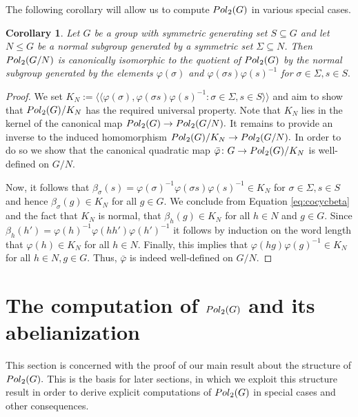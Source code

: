\documentclass[a4paper,11pt]{amsproc}
\theoremstyle{plain}
\newtheorem{corollary}[theorem]{Corollary}
\theoremstyle{definition}
\begin{document}
The following corollary will allow us to compute ${\rm Pol}_2(G)$ in various special cases.


\begin{corollary} \label{cor:comp}
Let $G$ be a group with symmetric generating set $S \subseteq G$ and let $N \leq G$ be a normal subgroup generated by a symmetric set $\Sigma \subseteq N$. Then ${\rm Pol}_2(G/N)$ is canonically isomorphic to the quotient of ${\rm Pol}_2(G)$ by the normal subgroup generated by the elements $\varphi(\sigma)$ and $\varphi(\sigma s) \varphi(s)^{-1}$ for $\sigma \in \Sigma, s \in S.$\end{corollary}
\begin{proof}
We set $K_N := \langle \! \langle \varphi(\sigma), \varphi(\sigma s) \varphi(s)^{-1}\colon  \sigma \in \Sigma, s \in S \rangle \! \rangle$ and aim to show that ${\rm Pol}_2(G)/K_N$ has the required universal property. Note that $K_N$ lies in the kernel of the canonical map ${\rm Pol}_2(G) \to {\rm Pol}_2(G/N).$ It remains to provide an inverse to the induced homomorphism ${\rm Pol}_2(G)/K_N \to {\rm Pol}_2(G/N).$ In order to do so we show that the canonical quadratic map $\bar \varphi \colon G \to {\rm Pol}_2(G)/K_N$ is well-defined on $G/N.$

Now, it follows that $\beta_{\sigma}(s) = \varphi(\sigma)^{-1}\varphi(\sigma s) \varphi(s)^{-1}  \in K_N$ for $\sigma \in \Sigma, s\in S$ and hence $\beta_{\sigma}(g) \in K_N$ for all $g \in G$. We conclude from Equation \eqref{eq:cocycbeta} and the fact that $K_N$ is normal, that $\beta_h(g) \in K_N$ for all $h \in N$ and $g \in G.$ Since $\beta_{h}(h')= \varphi(h)^{-1} \varphi(hh')\varphi(h')^{-1}$ it follows by induction on the word length that $\varphi(h) \in K_N$ for all $h \in N.$ Finally, this implies that $\varphi(hg)\varphi(g)^{-1} \in K_N$ for all $h \in N,g \in G$. Thus, $\bar \varphi$ is indeed well-defined on $G/N.$
\end{proof}

\section{The computation of ${\rm Pol}_2(G)$ and its abelianization} \label{sec:proof}

This section is concerned with the proof of our main result about the structure of ${\rm Pol}_2(G).$ This is the basis for later sections, in which we exploit this structure result in order to derive explicit computations of ${\rm Pol}_2(G)$ in special cases and other consequences.
\end{document}
